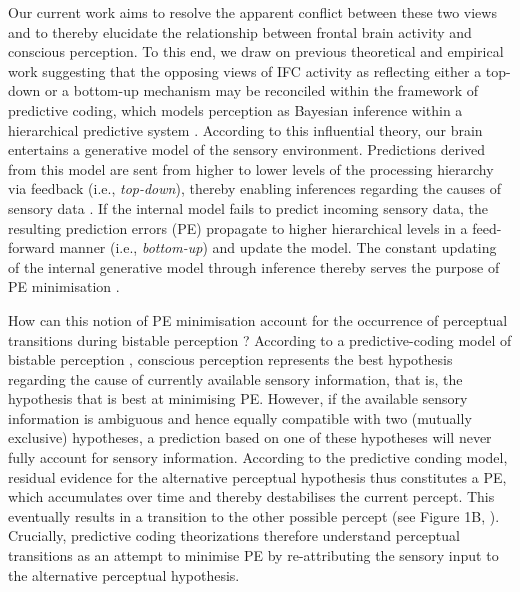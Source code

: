 \documentclass[12pt]{article}
\begin{document}
Our current work aims to resolve the apparent conflict between these two views and to thereby elucidate the relationship between frontal brain activity and conscious perception. To this end, we draw on previous theoretical and empirical work suggesting that the opposing views of IFC activity as reflecting either a top-down or a bottom-up mechanism may be reconciled within the framework of predictive coding, which models perception as Bayesian inference within a hierarchical predictive system \parencite{Hohwy2008a, Weilnhammer2017, Brascamp2018}. According to this influential theory, our brain entertains a generative model of the sensory environment. Predictions derived from this model are sent from higher to lower levels of the processing hierarchy via feedback (i.e., \textit{top-down}), thereby enabling inferences regarding the causes of sensory data \parencite{knill_bayesian_2004, Friston2005, Clark2013}. If the internal model fails to predict incoming sensory data, the resulting prediction errors (PE) propagate to higher hierarchical levels in a feed-forward manner (i.e., \textit{bottom-up}) and update the model. The constant updating of the internal generative model through inference thereby serves the purpose of PE minimisation \parencite{Hohwy2012}. 

How can this notion of PE minimisation account for the occurrence of perceptual transitions during bistable perception \parencite{Sundareswara2008, Gershman2012}? According to a predictive-coding model of bistable perception \parencite{Hohwy2008a, Weilnhammer2017}, conscious perception represents the best hypothesis regarding the cause of currently available sensory information, that is, the hypothesis that is best at minimising PE. However, if the available sensory information is ambiguous and hence equally compatible with two (mutually exclusive) hypotheses, a prediction based on one of these hypotheses will never fully account for sensory information. According to the predictive conding model, residual evidence for the alternative perceptual hypothesis thus constitutes a PE, which accumulates over time and thereby destabilises the current percept. This eventually results in a transition to the other possible percept (see Figure 1B, \cite{Weilnhammer2017}). Crucially, predictive coding theorizations therefore understand perceptual transitions as an attempt to minimise PE by re-attributing the sensory input to the alternative perceptual hypothesis. 
\end{document}

